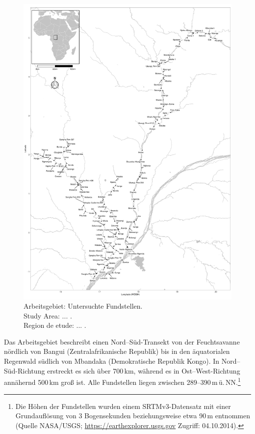 \begin{figure}[p]
	\centering
	\includegraphics[width=.95\textwidth]{fig/1_Fundstellen.pdf}
	\caption{Arbeitsgebiet: Untersuchte Fundstellen. \\ Study Area: ... . \\ Region de etude: ... .}
	\label{fig:ArbeitsgebietKarte}
\end{figure}

Das Arbeitsgebiet beschreibt einen Nord–Süd-Transekt von der Feuchtsavanne nördlich von Bangui (Zentralafrikanische Republik) bis in den äquatorialen Regenwald südlich von Mba\-ndaka (Demokratische Republik Kongo). In Nord--Süd-Richtung erstreckt es sich über 700\,km, während es in Ost--West-Richtung annähernd 500\,km groß ist. Alle Fundstellen liegen zwischen 289--390\,m\,ü.\,NN.\footnote{Die Höhen der Fundstellen wurden einem SRTMv3-Datensatz mit einer Grundauflösung von 3 Bogensekunden beziehungsweise etwa 90\,m entnommen (Quelle NASA/USGS; \url{https://earthexplorer.usgs.gov} Zugriff: 04.10.2014).}

